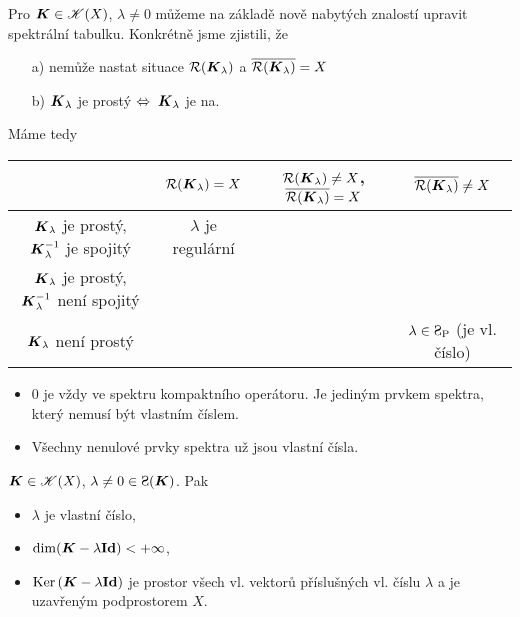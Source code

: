 Pro  $\boldsymbol{K}\in \mathscr{K}(X)$, $\lambda\neq 0$ můžeme na základě nově nabytých znalostí upravit spektrální tabulku. Konkrétně jsme zjistili, že
\begin{enumerate}
    \item[a)] nemůže nastat situace $\mathcal{R}(\boldsymbol{K}_\lambda)$ a $\overline{\mathcal{R}(\boldsymbol{K}_\lambda)}=X$
    \item[b)] $\boldsymbol{K}_\lambda$ je prostý $\Leftrightarrow \;\boldsymbol{K}_\lambda$ je na.
\end{enumerate}
Máme tedy

\begin{table}[h!]
    \centering
    \begin{tabu}{c||c|c|c}
  &$\mathcal{R}(\boldsymbol{K}_\lambda)=X$ & $\mathcal{R}(\boldsymbol{K}_\lambda)\neq X$, $\overline{\mathcal{R}(\boldsymbol{K}_\lambda)}=X$     &  $\overline{\mathcal{R}(\boldsymbol{K}_\lambda)}\neq X$ \\\hline\hline
  
  $\boldsymbol{K}_\lambda$ je prostý, $\boldsymbol{K}_\lambda^{-1}$ je spojitý     & $\lambda$ je regulární &   &  \\\hline 
  
  $\boldsymbol{K}_\lambda$ je prostý, $\boldsymbol{K}_\lambda^{-1}$ není spojitý    &      &    & \\ \hline
   
   $\boldsymbol{K}_\lambda$ není prostý  &  &  & $\lambda\in \SpP$ (je vl. číslo) 
    \end{tabu}
\end{table}

\begin{itemize}
    \item $0$ je vždy ve spektru kompaktního operátoru. Je jediným prvkem spektra, který nemusí být vlastním číslem.
    \item Všechny nenulové prvky spektra už jsou vlastní čísla.
\end{itemize}


\begin{lemma}%
$\boldsymbol{K} \in \mathscr{K}(X)$, $\lambda \neq 0\in \Sp(\map K)$. Pak \begin{itemize}
    \item $\lambda$ je vlastní číslo,
    \item $\dim(\boldsymbol{K} - \lambda \boldsymbol{\mathrm{Id}} ) < + \infty$,
    \item $\operatorname{Ker}\, (\boldsymbol{K} - \lambda \boldsymbol{\mathrm{Id}} )$ je prostor všech vl. vektorů příslušných vl. číslu $\lambda$ a je uzavřeným podprostorem $X$.
\end{itemize}
\end{lemma}

